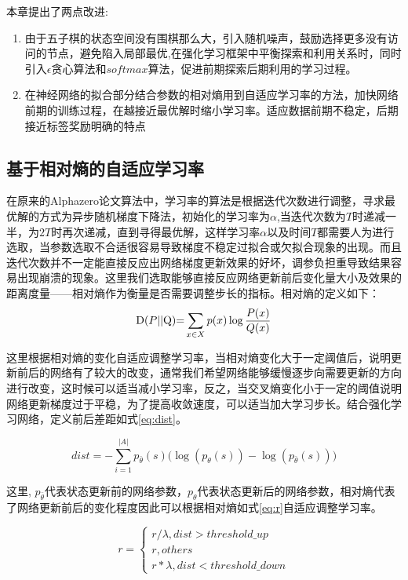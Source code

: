 本章提出了两点改进:
\begin{enumerate}
\item 由于五子棋的状态空间没有围棋那么大，引入随机噪声，鼓励选择更多没有访问的节点，避免陷入局部最优,在强化学习框架中平衡探索和利用关系时，同时引入$\epsilon$贪心算法和$softmax$算法，促进前期探索后期利用的学习过程。
\item 在神经网络的拟合部分结合参数的相对熵用到自适应学习率的方法，加快网络前期的训练过程，在越接近最优解时缩小学习率。适应数据前期不稳定，后期接近标签奖励明确的特点
\end{enumerate}



\subsection{基于相对熵的自适应学习率}
在原来的Alphazero论文算法中，学习率的算法是根据迭代次数进行调整，寻求最优解的方式为异步随机梯度下降法，初始化的学习率为$\alpha$,当迭代次数为$T$时递减一半，为$2T$时再次递减，直到寻得最优解，这样学习率$\alpha$以及时间$T$都需要人为进行选取，当参数选取不合适很容易导致梯度不稳定过拟合或欠拟合现象的出现。而且迭代次数并不一定能直接反应出网络梯度更新效果的好坏，调参负担重导致结果容易出现崩溃的现象。这里我们选取能够直接反应网络更新前后变化量大小及效果的距离度量——相对熵作为衡量是否需要调整步长的指标。相对熵的定义如下：
\begin{equation}
{\rm{D}}(P{\rm{||Q}}){\rm{ = }}\sum\limits_{x \in X} {p(x)\log \frac{{P(x)}}{{Q(x)}}} 
\end{equation}

这里根据相对熵的变化自适应调整学习率，当相对熵变化大于一定阈值后，说明更新前后的网络有了较大的改变，通常我们希望网络能够缓慢逐步向需要更新的方向进行改变，这时候可以适当减小学习率，反之，当交叉熵变化小于一定的阈值说明网络更新梯度过于平稳，为了提高收敛速度，可以适当加大学习步长。结合强化学习网络，定义前后差距如式\ref{eq:dist}。

\begin{equation}
\label{eq:dist}
dist =  - \sum\limits_{i = 1}^{|A|} {{p_{\bar \theta }}(s)(\log ({p_\theta }(s)) - \log ({p_{\bar \theta }}(s))} )
\end{equation}

这里, $p_{\bar \theta}$代表状态更新前的网络参数，$p_\theta $代表状态更新后的网络参数，相对熵代表了网络更新前后的变化程度因此可以根据相对熵如式\ref{eq:r}自适应调整学习率。

\begin{equation}
\label{eq:r}
r = \left\{ {\begin{array}{*{20}{c}}
	{r/\lambda ,dist > threshold\_up}\\
	{r,others}\\
	{r*\lambda ,dist < threshold\_down}
	\end{array}} \right.
\end{equation}


